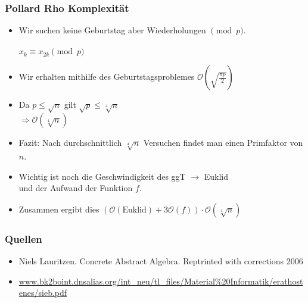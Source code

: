 \documentclass[mathserif, compress]{beamer}
\begin{document}
\begin{frame}
  \frametitle{Pollard Rho Komplexit\"at}
  \begin{itemize}
    \item Wir suchen keine Geburtstag aber Wiederholungen $\pmod p$.\\
    \ \\ $x_k \equiv x_{2k} \pmod p$
    \item Wir erhalten mithilfe des Geburtstagsproblemes $\mathcal O(\sqrt{\frac{\pi p}{2}})$
    \item Da $p\leq \sqrt{n}$ gilt $\sqrt{p} \leq \sqrt[4]{n}$\\
	  $\Rightarrow \mathcal O(\sqrt[4]{n})$
    \item Fazit: Nach durchschnittlich $\sqrt[4]{n}$ Versuchen findet man einen Primfaktor von $n$.
    \item Wichtig ist noch die Geschwindigkeit des ggT $\rightarrow$ Euklid\\
          und der Aufwand der Funktion $f$.
    \item Zusammen ergibt dies $(\mathcal O(\text{Euklid})+3\mathcal O(f))\cdot\mathcal O(\sqrt[4]{n})$
  \end{itemize}
\end{frame}

\begin{frame}
\frametitle{Quellen}
  \begin{itemize}
    \item Niels Lauritzen. Concrete Abstract Algebra. Reptrinted with corrections 2006
    \item \url{www.bk2boint.dnsalias.org/int_neu/tl_files/Material\%20Informatik/erathostenes/sieb.pdf}
  \end{itemize}    
\end{frame}
\end{document}

